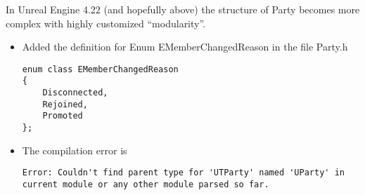 \documentclass{article}
\begin{document}
In Unreal Engine 4.22 (and hopefully above) the structure of {\ttfamily Party} becomes more complex with highly customized ``modularity''.


\begin{itemize}
\item Added the definition for Enum EMemberChangedReason in the file {\color{filecolor}Party.h}
\lstset{language=c++}
  \begin{lstlisting}
enum class EMemberChangedReason
{
    Disconnected,
    Rejoined,
    Promoted
};
  \end{lstlisting}
\item The compilation error is
\lstset{language=bash} 
\begin{lstlisting}[frame=single]
Error: Couldn't find parent type for 'UTParty' named 'UParty' in current module or any other module parsed so far.
\end{lstlisting}


\end{itemize}
\end{document}
